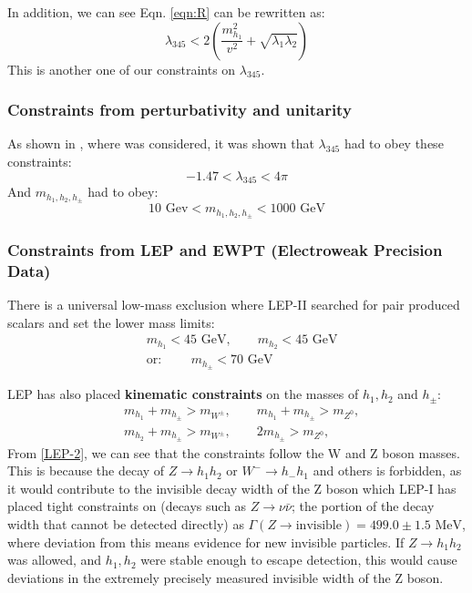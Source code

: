 \documentclass[12pt]{article}
\begin{document}
In addition, we can see Eqn. \ref{eqn:R} can be rewritten as:
\begin{equation}
    \lambda_{345} < 2\left( \frac{m_{h_1}^2}{v^2} + \sqrt{\lambda_1\lambda_2}\right)
\end{equation}
This is another one of our constraints on $\lambda_{345}$.

\subsubsection{Constraints from perturbativity and unitarity}
As shown in \cite{Belyaev:2016lok}, where \cite{Aruhrib2012Inert} was considered, it was shown that $\lambda_{345}$ had to obey these constraints:
\begin{equation}
    -1.47 < \lambda_{345} < 4\pi
    \label{eqn:l345_pert}
\end{equation}
And $m_{h_1, h_2, h_\pm}$ had to obey:
\begin{equation}
    10\text{ Gev} < m_{h_1, h_2, h_\pm} < 1000\text{ GeV}
    \label{eqn:masses_pert}
\end{equation}

\subsubsection{Constraints from LEP and EWPT (Electroweak Precision Data)}
There is a universal low-mass exclusion where LEP-II searched for pair produced scalars and set the lower mass limits:
\begin{equation}
    \begin{split}
        &m_{h_1} < 45  \text{ GeV}, \qquad m_{h_2} < 45 \text{ GeV}
         \\ &\text{or: } \qquad m_{h_\pm} <70 \text{ GeV}
    \end{split}
    \label{LEP-1}
\end{equation}

LEP has also placed \textbf{kinematic constraints} on the masses of $h_1, h_2$ and  $h_\pm$:
\begin{equation}
    \begin{split}
        &m_{h_1} + m_{h_\pm} > m_{W^\pm}, \qquad m_{h_1} + m_{h_\pm} > m_{Z^0},
        \\&m_{h_2} + m_{h_\pm} > m_{W^\pm}, \qquad 2m_{h_\pm} > m_{Z^0}, 
    \end{split}
\label{LEP-2}
\end{equation}
From \ref{LEP-2}, we can see that the constraints follow the W and Z boson masses. This is because the decay of $Z \rightarrow h_1h_2$ or $W^- \rightarrow h_-h_1$ and others is forbidden, as it would contribute to the invisible decay width of the Z boson which LEP-I has placed tight constraints on (decays such as $Z\rightarrow \nu \bar{\nu}$; the portion of the decay width that cannot be detected directly) as $\Gamma(Z\rightarrow \text{invisible}) = 499.0 \pm 1.5 \text{ MeV}$, where deviation from this means evidence for new invisible particles. If $Z \rightarrow h_1h_2$ was allowed, and $ h_1,h_2$ were stable enough to escape detection, this would cause deviations in the extremely precisely measured invisible width of the Z boson.
\end{document}
